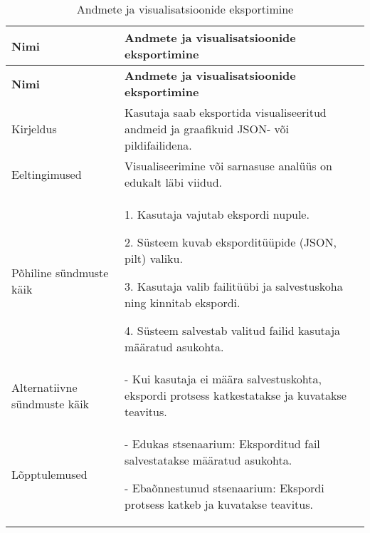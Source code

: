 \begin{longtable}{|p{2.5cm}|p{11cm}|}
    \caption{{Andmete ja visualisatsioonide eksportimine}}
    \label{tab:kasutusjuht6}\\ \hline
    \textbf{Nimi} &  \textbf{Andmete ja visualisatsioonide eksportimine}  \\
    \hline
    \endfirsthead
    \hline
    \textbf{Nimi} &  \textbf{Andmete ja visualisatsioonide eksportimine}  \\
    \hline
    \endhead
    \hline
    \endfoot
    \hline
    \endlastfoot
    Kirjeldus & Kasutaja saab eksportida visualiseeritud andmeid ja graafikuid JSON- või pildifailidena.\\ \hline
    Eeltingimused & Visualiseerimine või sarnasuse analüüs on edukalt läbi viidud.\\ \hline
    Põhiline sündmuste käik & 
    1. Kasutaja vajutab ekspordi nupule.
    
    2. Süsteem kuvab eksporditüüpide (JSON, pilt) valiku.
    
    3. Kasutaja valib failitüübi ja salvestuskoha ning kinnitab ekspordi.
    
    4. Süsteem salvestab valitud failid kasutaja määratud asukohta.
    \\ \hline
    Alternatiivne sündmuste käik & 
    - Kui kasutaja ei määra salvestuskohta, ekspordi protsess katkestatakse ja kuvatakse teavitus.
    \\ \hline
    Lõpptulemused & 
    - Edukas stsenaarium: Eksporditud fail salvestatakse määratud asukohta.
    
    - Ebaõnnestunud stsenaarium: Ekspordi protsess katkeb ja kuvatakse teavitus.
    \\ \hline
\end{longtable}



